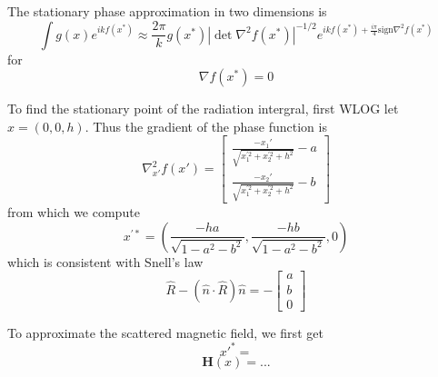 \documentclass{article}
\newcommand{\abs}[1]{\left\lvert #1 \right\rvert}
\theoremstyle{plain}
\begin{document}
The stationary phase approximation in two dimensions is
\begin{equation}
	\int g(x) e^{ikf(x^*)}
	\approx \frac{2\pi}{k} g(x^*)
	\abs{\det \nabla^2 f(x^*)}^{-1/2}
	e^{ikf(x^*) + \frac{i\pi}{4}\text{sign}\nabla^2 f(x^*)}
\end{equation}
for
\begin{equation}
	\nabla f(x^*) = 0
\end{equation}


To find the stationary point of the radiation intergral, first WLOG let $x=(0,0,h)$.
Thus the gradient of the phase function is
\begin{equation}
	\nabla^2_{x'} f(x') = 
	\begin{bmatrix}
		\frac{-x_1'}{\sqrt{x_1^{'2} + x_2^{'2} + h^2}} - a \\
		\frac{-x_2'}{\sqrt{x_1^{'2} + x_2^{'2} + h^2}} - b
	\end{bmatrix}
\end{equation} %
from which we compute
\begin{equation}
	x^{'*} = \left( \frac{-ha}{\sqrt{ 1 - a^2 - b^2 }}, \frac{-hb}{\sqrt{ 1 - a^2 - b^2 }}, 0 \right)
\end{equation}
which is consistent with Snell's law
\begin{equation}
	\hat{R} - \left( \hat{n}\cdot\hat{R} \right)\hat{n} = 
	-\begin{bmatrix}
		a \\
		b \\
		0
	\end{bmatrix}
\end{equation}

To approximate the scattered magnetic field, we first get
\begin{equation}
	x'^* = 
\end{equation}
\begin{equation}
	\mathbf{H}(x)
	= ...
\end{equation}
\end{document}
